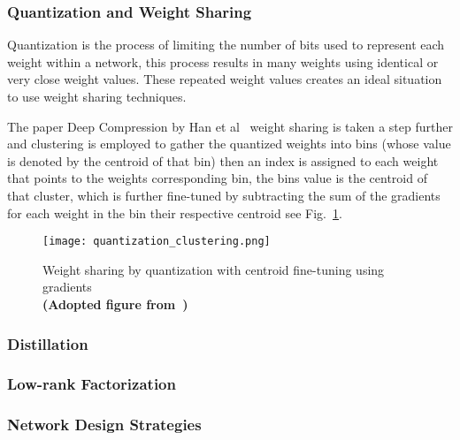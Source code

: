 \documentclass[../../D1.tex]{subfiles}
\begin{document}
\subsubsection{Quantization and Weight Sharing}\label{sec:Quantization}

Quantization is the process of limiting the number of bits used to represent each weight within a network, this process results in many weights using identical or very close weight values. 
These repeated weight values creates an ideal situation to use weight sharing techniques.

The paper Deep Compression by Han et al~\autocite{hanDeepCompressionCompressing2016} weight sharing is taken a step further and clustering is employed to gather the quantized weights into bins (whose value is denoted by the centroid of that bin) then an index is assigned to each weight that points to the weights corresponding bin, the bins value is the centroid of that cluster, which is further fine-tuned by subtracting the sum of the gradients for each weight in the bin their respective centroid see Fig.~\ref{fig:QuantizationClust}.  

\begin{figure}[H]
    \begin{center}
        \texttt{[image: quantization\_clustering.png]} 
    \end{center}
    
    \caption{Weight sharing by quantization with centroid fine-tuning using gradients\\ \textbf{(Adopted figure from~\autocite{hanDeepCompressionCompressing2016})}}
    \label{fig:QuantizationClust}   
\end{figure}



\subsubsection{Distillation}\label{sec:Distillation}

\subsubsection{Low-rank Factorization}\label{sec:lrFactorization}

\subsubsection{Network Design Strategies}\label{sec:NetworkDesignStrat}
\end{document}
